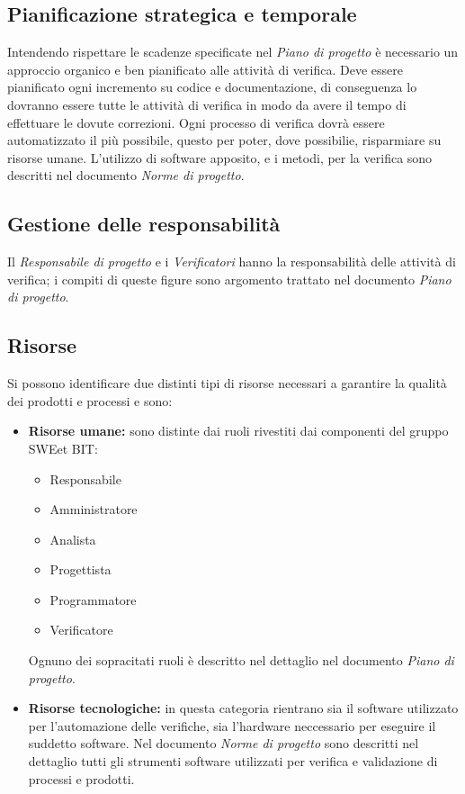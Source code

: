   \subsection{Pianificazione strategica e temporale}
    Intendendo rispettare le scadenze specificate nel \emph{Piano di progetto} è necessario un approccio organico e ben pianificato alle attività di verifica.
    Deve essere pianificato ogni incremento su codice e documentazione, di conseguenza lo dovranno essere tutte le attività di verifica
    in modo da avere il tempo di effettuare le dovute correzioni. Ogni processo di verifica dovrà essere automatizzato il più possibile, questo per poter, dove possibilie,
    risparmiare su risorse umane. L'utilizzo di software apposito, e i metodi, per la verifica sono descritti nel documento \emph{Norme di progetto}.

  \subsection{Gestione delle responsabilità}
    Il \emph{Responsabile di progetto} e i \emph{Verificatori} hanno la responsabilità delle attività di verifica;
    i compiti di queste figure sono argomento trattato nel documento \emph{Piano di progetto}.

  \subsection{Risorse}
    Si possono identificare due distinti tipi di risorse necessari a garantire la qualità dei prodotti e processi e sono:
    \begin{itemize}
      \item \textbf{Risorse umane:} sono distinte dai ruoli rivestiti dai componenti del gruppo SWEet BIT:
      \begin{itemize}
        \item Responsabile
        \item Amministratore
        \item Analista
        \item Progettista
        \item Programmatore
        \item Verificatore
      \end{itemize}
      Ognuno dei sopracitati ruoli è descritto nel dettaglio nel documento \emph{Piano di progetto}.
      \item \textbf{Risorse tecnologiche:} in questa categoria rientrano sia il software utilizzato per l'automazione delle verifiche,
      sia l'hardware neccessario per eseguire il suddetto software. Nel documento \emph{Norme di progetto} sono descritti nel dettaglio
      tutti gli strumenti software utilizzati per verifica e validazione di processi e prodotti.
    \end{itemize}
